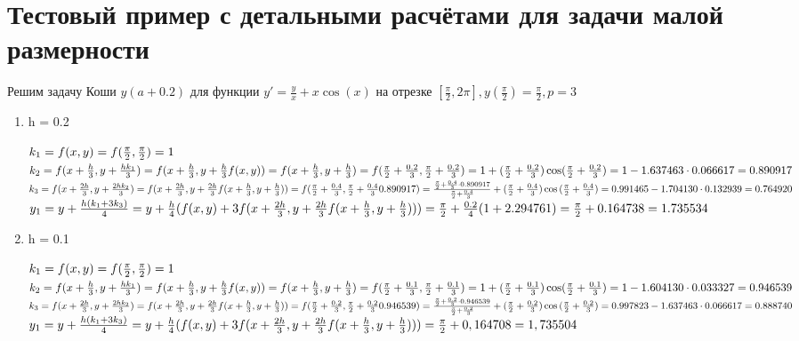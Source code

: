\documentclass{article}
\begin{document}
	\section{Тестовый пример с детальными расчётами для задачи малой размерности}
	Решим задачу Коши $y(a + 0.2)$ для функции $y' = \frac{y}{x} + x\cos(x)$ на отрезке $[\frac{\pi}{2}, 2\pi] ,
	 y(\frac{\pi}{2})=\frac{\pi}{2}, p = 3$
	\begin{enumerate}
		\item h = 0.2
		
		$k_1 = f(x,y) = f(\frac{\pi}{2}, \frac{\pi}{2})= 1\\$
		$k_2 = f(x + \frac{h}{3},y + \frac{hk_1}{3})= f(x + \frac{h}{3},y + \frac{h}{3}f(x,y))= f(x + \frac{h}{3},y + \frac{h}{3}) = f(\frac{\pi}{2} + \frac{0.2}{3},\frac{\pi}{2} + \frac{0.2}{3})= 1 + (\frac{\pi}{2} + \frac{0.2}{3})\cos(\frac{\pi}{2} + \frac{0.2}{3}) = 1 - 1.637463\cdot0.066617 = 0.890917\\$
		$k_3 = f(x + \frac{2h}{3},y + \frac{2hk_2}{3})= f(x + \frac{2h}{3},y + \frac{2h}{3}f(x + \frac{h}{3},y + \frac{h}{3})) = f(\frac{\pi}{2} + \frac{0.4}{3},\frac{\pi}{2} + \frac{0.4 }{3}0.890917)= \frac{\frac{\pi}{2}+\frac{0.4}{3}\cdot0.890917}{\frac{\pi}{2}+\frac{0.4}{3}} + (\frac{\pi}{2}+\frac{0.4}{3})\cos{(\frac{\pi}{2}+\frac{0.4}{3})} = 0.991465-1.704130\cdot0.132939 = 0.764920\\$
		$y_1 = y + \frac{h(k_1+3k_3)}{4} = y + \frac{h}{4}(f(x,y)+3f(x + \frac{2h}{3},y + \frac{2h}{3}f(x + \frac{h}{3},y + \frac{h}{3}))) =\frac{\pi}{2} + \frac{0.2}{4}(1+2.294761) = \frac{\pi}{2} + 0.164738 =1.735534 \\$
		\item h = 0.1
		
		$k_1 = f(x,y) = f(\frac{\pi}{2}, \frac{\pi}{2})= 1\\$
		$k_2 = f(x + \frac{h}{3},y + \frac{hk_1}{3})= f(x + \frac{h}{3},y + \frac{h}{3}f(x,y))= f(x + \frac{h}{3},y + \frac{h}{3}) = f(\frac{\pi}{2} + \frac{0.1}{3},\frac{\pi}{2} + \frac{0.1}{3})= 1 + (\frac{\pi}{2} + \frac{0.1}{3})\cos(\frac{\pi}{2} + \frac{0.1}{3}) = 1 - 1.604130\cdot0.033327 = 0.946539\\$
		$k_3 = f(x + \frac{2h}{3},y + \frac{2hk_2}{3})= f(x + \frac{2h}{3},y + \frac{2h}{3}f(x + \frac{h}{3},y + \frac{h}{3})) = f(\frac{\pi}{2} + \frac{0.2}{3},\frac{\pi}{2} + \frac{0.2 }{3}0.946539)= \frac{\frac{\pi}{2}+\frac{0.2}{3}\cdot0.946539}{\frac{\pi}{2}+\frac{0.2}{3}} + (\frac{\pi}{2}+\frac{0.2}{3})\cos{(\frac{\pi}{2}+\frac{0.2}{3})} = 0.997823-1.637463\cdot0.066617 = 0.888740\\$
		$y_1 = y + \frac{h(k_1+3k_3)}{4} = y + \frac{h}{4}(f(x,y)+3f(x + \frac{2h}{3},y + \frac{2h}{3}f(x + \frac{h}{3},y + \frac{h}{3}))) = \frac{\pi}{2} + 0,164708 = 1,735504 \\$
	\end{enumerate}
\end{document}
